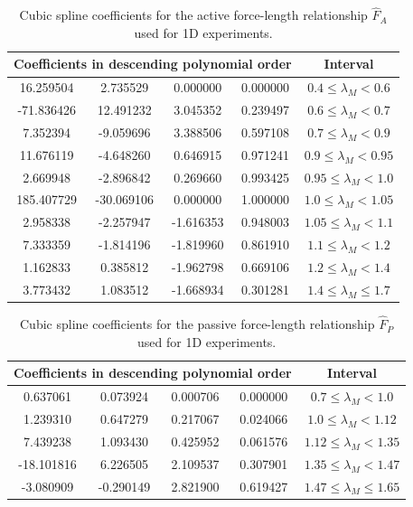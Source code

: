 \documentclass{sfuthesis}
\numberwithin{equation}{section}
\numberwithin{figure}{chapter}
\numberwithin{table}{chapter}
\theoremstyle{definition}
\begin{document}
\begin{appendices}
\begin{table}
\centering
\begin{tabular}{|cccc|c|}
\hline
\multicolumn{4}{|c|}{Coefficients in descending polynomial order} & Interval \\\hline
16.259504 & 2.735529 & 0.000000 & 0.000000 & $0.4 \leq \lambda_M < 0.6$\\
-71.836426 & 12.491232 & 3.045352 & 0.239497 & $0.6 \leq \lambda_M < 0.7$\\
7.352394 & -9.059696 & 3.388506 & 0.597108 & $0.7 \leq \lambda_M < 0.9$\\
11.676119 & -4.648260 & 0.646915 & 0.971241 & $0.9 \leq \lambda_M < 0.95$\\
2.669948 & -2.896842 & 0.269660 & 0.993425 & $0.95 \leq \lambda_M < 1.0$\\
185.407729 & -30.069106 & 0.000000 & 1.000000 & $1.0 \leq \lambda_M < 1.05$\\
2.958338 & -2.257947 & -1.616353 & 0.948003 & $1.05 \leq \lambda_M < 1.1$\\
7.333359 & -1.814196 & -1.819960 & 0.861910 & $1.1 \leq \lambda_M < 1.2$\\
1.162833 & 0.385812 & -1.962798 & 0.669106 & $1.2 \leq \lambda_M < 1.4$\\
3.773432 & 1.083512 & -1.668934 & 0.301281 & $1.4 \leq \lambda_M \leq 1.7$\\
\hline
\end{tabular}
\caption{Cubic spline coefficients for the active force-length relationship $\widehat{F}_A$ used for 1D experiments.\label{tab:coef_1D_active}}
\end{table}

\begin{table}
\centering
\begin{tabular}{|cccc|c|}
\hline
\multicolumn{4}{|c|}{Coefficients in descending polynomial order} & Interval \\\hline
0.637061 & 0.073924 & 0.000706 & 0.000000 & $0.7 \leq \lambda_M < 1.0$\\
1.239310 & 0.647279 & 0.217067 & 0.024066 & $1.0 \leq \lambda_M < 1.12$\\
7.439238 & 1.093430 & 0.425952 & 0.061576 & $1.12 \leq \lambda_M < 1.35$\\
-18.101816 & 6.226505 & 2.109537 & 0.307901 & $1.35 \leq \lambda_M < 1.47$\\
-3.080909 & -0.290149 & 2.821900 & 0.619427 & $1.47 \leq \lambda_M \leq 1.65$\\
\hline
\end{tabular}
\caption{Cubic spline coefficients for the passive force-length relationship $\widehat{F}_P$ used for 1D experiments.}
\end{table}


\end{appendices}
\end{document}
